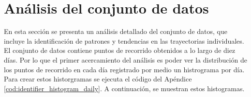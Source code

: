 \section{Análisis del conjunto de datos}
\label{sec:analisis_conjunto_datos}

En esta sección se presenta un análisis detallado del conjunto de datos, que incluye la identificación de patrones y tendencias en las trayectorias individuales. El conjunto de datos contiene puntos de recorrido obtenidos a lo largo de diez días. Por lo que el primer acercamiento del análisis es poder ver la distribución de los puntos de recorrido en cada día registrado por medio un histrograma por día. Para crear estos historgramas se ejecuta el código del Apéndice \ref{cod:identifier_histogram_daily}. A continuación, se muestran estos histogramas.

